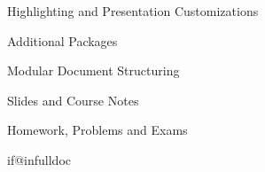 \begin{sfragment}[id=sec.customhighlight]{Highlighting and Presentation Customizations}
\end{sfragment}

\begin{sfragment}{Additional Packages}
  
  \begin{sfragment}{Modular Document Structuring}
    
  \end{sfragment}
  \begin{sfragment}{Slides and Course Notes}
    
  \end{sfragment}
  \begin{sfragment}{Homework, Problems and Exams}
    
    
    
  \end{sfragment}

\end{sfragment}
	
\csname if@infulldoc\endcsname\else
\printbibliography

\fi


